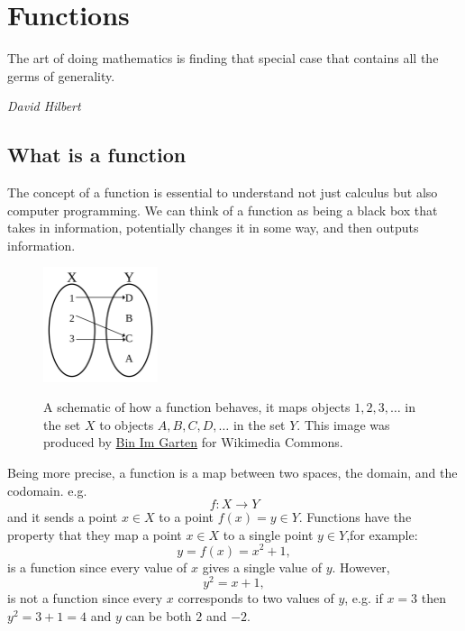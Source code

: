 \chapter{Functions}
\label{sec:functions}

\epigraph{The art of doing mathematics is finding that special case that contains all the germs of generality. }{\textit{David Hilbert}}

\section{What is a function}
The concept of a function is essential to understand not just calculus but also computer programming. We can think of a function as being a black box that takes in information, potentially changes it in some way, and then outputs information.\\

\begin{figure}[ht]
    \centering
    \includegraphics[width=0.3\textwidth, alt ={A schematic of how a function behaves produced by Bin Im Garten for Wikimedia Commons.}]{figures/Injection_keine_Injektion_2a.png}
    \caption{A schematic of how a function behaves, it maps objects $1,2,3,\dots$ in the \gls{set} $X$ to objects $A,B,C,D,\dots$ in the set $Y$. This image was produced by \href{https://commons.wikimedia.org/wiki/File:Injection\_keine\_Injektion\_2a.svg}{Bin Im Garten} for Wikimedia Commons.}
\label{fig: function schematic}
\end{figure}

Being more precise, a function is a map between two spaces, the domain, and the codomain. e.g.
\begin{equation*}
f:X\to Y
\end{equation*}
and it sends a point $x\in X$ to a point $f(x)=y\in Y$.  Functions have the property that they map a point $x\in X$ to a single point $y\in Y$,for example:
\begin{equation*}
y=f(x)=x^{2}+1,
\end{equation*}
is a function since every value of $x$ gives a single value of $y$. However, 
\begin{equation*}
y^{2}=x+1,
\end{equation*}
is not a function since every $x$ corresponds to two values of $y$, e.g. if $x=3$ then $y^{2}=3+1=4$ and $y$ can be both $2$ and $-2$.\\


